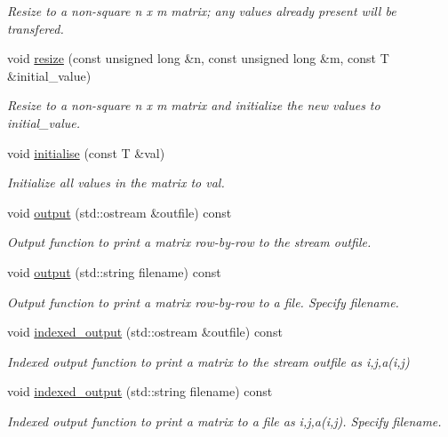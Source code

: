 \begin{DoxyCompactItemize}
\begin{DoxyCompactList}\small\item\em Resize to a non-\/square n x m matrix; any values already present will be transfered. \end{DoxyCompactList}\item 
void \hyperlink{classoomph_1_1DenseMatrix_aeb6daf6539fee8d3d6f7a81306798b10}{resize} (const unsigned long \&n, const unsigned long \&m, const T \&initial\+\_\+value)
\begin{DoxyCompactList}\small\item\em Resize to a non-\/square n x m matrix and initialize the new values to initial\+\_\+value. \end{DoxyCompactList}\item 
void \hyperlink{classoomph_1_1DenseMatrix_aafcfbb0309fdcbd84f8654fe1b5601fd}{initialise} (const T \&val)
\begin{DoxyCompactList}\small\item\em Initialize all values in the matrix to val. \end{DoxyCompactList}\item 
void \hyperlink{classoomph_1_1DenseMatrix_a03e20626e889a1ab4582614f55784165}{output} (std\+::ostream \&outfile) const
\begin{DoxyCompactList}\small\item\em Output function to print a matrix row-\/by-\/row to the stream outfile. \end{DoxyCompactList}\item 
void \hyperlink{classoomph_1_1DenseMatrix_a4ab60b1e7db98bcb5b75b080266e452e}{output} (std\+::string filename) const
\begin{DoxyCompactList}\small\item\em Output function to print a matrix row-\/by-\/row to a file. Specify filename. \end{DoxyCompactList}\item 
void \hyperlink{classoomph_1_1DenseMatrix_a440b549690cfc07c85f395eb06951321}{indexed\+\_\+output} (std\+::ostream \&outfile) const
\begin{DoxyCompactList}\small\item\em Indexed output function to print a matrix to the stream outfile as i,j,a(i,j) \end{DoxyCompactList}\item 
void \hyperlink{classoomph_1_1DenseMatrix_a5730d359fa98ea501ab7115147a4bd87}{indexed\+\_\+output} (std\+::string filename) const
\begin{DoxyCompactList}\small\item\em Indexed output function to print a matrix to a file as i,j,a(i,j). Specify filename. \end{DoxyCompactList}\item 

\end{DoxyCompactItemize}
